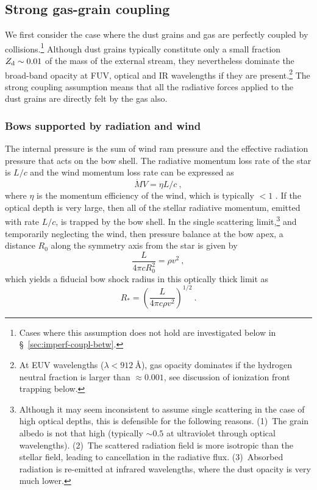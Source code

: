 \subsection{Strong gas-grain coupling}
\label{sec:strong-gas-grain}

We first consider the case where the dust grains and gas are perfectly
coupled by collisions.\footnote{%
  Cases where this assumption does not hold are investigated below in
  \S~\ref{sec:imperf-coupl-betw}.} %
Although dust grains typically constitute only a small fraction
\(Z_{\text{d}} \sim 0.01\) of the mass of the external stream, they
nevertheless dominate the broad-band opacity at FUV, optical and IR
wavelengths if they are present.\footnote{%
  At EUV wavelengths (\(\lambda < \SI{912}{\angstrom}\)), gas opacity
  dominates if the hydrogen neutral fraction is larger than
  \(\approx 0.001\), see discussion of ionization front trapping
  below.} %
The strong coupling assumption means that all the radiative forces
applied to the dust grains are directly felt by the gas also.

\subsubsection{Bows supported by radiation and wind}
\label{sec:three-bow-regimes}

The internal pressure is the sum of wind ram pressure and the
effective radiation pressure that acts on the bow shell.  The
radiative momentum loss rate of the star is \(L/c\) and the wind
momentum loss rate can be expressed as
\begin{equation}
  \label{eq:wind-efficiency}
  \dot{M} V = \eta L / c \ , 
\end{equation}
where \(\eta\) is the momentum efficiency of the wind, which is typically
\(< 1\) \citep{Lamers:1999b}. If the optical depth is very large, then
all of the stellar radiative momentum, emitted with rate \(L/c\), is
trapped by the bow shell.  In the single scattering limit,\footnote{%
  Although it may seem inconsistent to assume single scattering in the
  case of high optical depths, this is defensible for the following
  reasons. (1)~The grain albedo is not that high (typically
  \(\sim 0.5\) at ultraviolet through optical wavelengths). (2)~The
  scattered radiation field is more isotropic than the stellar field,
  leading to cancellation in the radiative
  flux. (3)~Absorbed radiation is re-emitted at infrared
  wavelengths, where the dust opacity is very much lower.} %
and temporarily neglecting the wind, then pressure balance at the bow
apex, a distance \(R_0\) along the symmetry axis from the star is
given by
\begin{equation}
  \label{eq:rad-press-balance-thick}
  \frac{L}{4 \pi c R_0^2} = \rho v^2 \ ,
\end{equation}
which yields a fiducial bow shock radius in this optically thick limit
as
\begin{equation}
  \label{eq:Rstar}
  R_* = \left(\frac{L}{4\pi c \rho v^2}\right)^{1/2} \ .
\end{equation}

